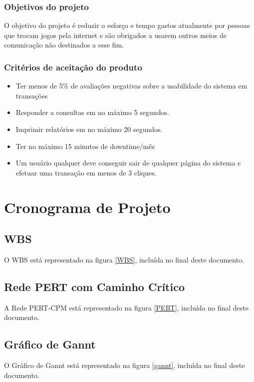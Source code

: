 \documentclass[a4paper,11pt]{article}
\begin{document}
		\subsubsection{Objetivos do projeto}
			O objetivo do projeto é reduzir o esforço e tempo gastos atualmente por pessoas que trocam jogos pela internet e são obrigados a usarem outros meios de comunicação não destinados a esse fim.
		\newpage
		\subsubsection{Critérios de aceitação do produto}
			\begin{itemize}
				\item Ter menos de 5\% de avaliações negativas sobre a usabilidade do sistema em transações
				\item Responder a consultas em no máximo 5 segundos.
				\item Imprimir relatórios em no máximo 20 segundos.
				\item Ter no máximo 15 minutos de downtime/mês
				\item Um usuário qualquer deve conseguir sair de qualquer página do sistema e efetuar uma transação em menos de 3 cliques.
			\end{itemize}
	
\section{Cronograma de Projeto}
	\subsection{WBS}
    	O WBS está representado na figura \ref{WBS}, incluída no final deste documento.
	\subsection{Rede PERT com Caminho Crítico}
		A Rede PERT-CPM está representado na figura \ref{PERT}, incluída no final deste documento.
	\subsection{Gráfico de Gannt}
		O Gráfico de Gannt está representado na figura \ref{gannt}, incluída no final deste documento.
\end{document}
